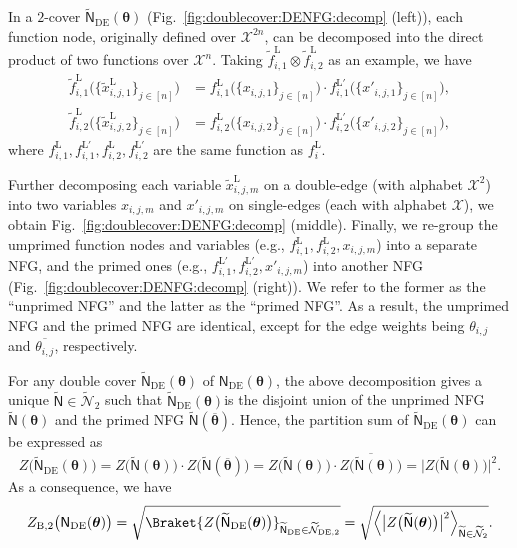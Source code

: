 \documentclass[conference]{IEEEtran}
\theoremstyle{plain}
\theoremstyle{definition}
\newcommand{\B}{\mathrm{B}}
\newcommand{\sfn}{\mathsf{N}}
\newcommand{\fl}[1]{ f^{\mathrm{L}}_{ #1 } }
\newcommand{\tfl}[1]{\widetilde{f}^{\mathrm{L}}_{ #1 }}
\newcommand{\txl}[1]{\widetilde{x}^{\mathrm{L}}_{ #1 }}
\newcommand{\btheta}{\boldsymbol{\theta}}
\newcommand{\sfnDE}{\sfn_{\mathrm{DE}}}
\begin{document}
 In a $2$-cover $\widetilde{\sfn}_\mathrm{DE}(\btheta)$
 (Fig.~\ref{fig:doublecover:DENFG:decomp} (left)), each function node,
 originally defined over $\mathcal X^{2n}$, can be decomposed into the direct
 product of two functions over $\mathcal X^{n}$. Taking $\tfl{i,1}\otimes
 \tfl{i,2}$ as an example, we have
 \begin{align*}
  \tfl{i,1}\bigl( \{\txl{i,j,1}\}_{j\in[n]} \bigr) & =
  \fl{i,1}\bigl( \{x_{i,j,1}\}_{j\in[n]} \bigr) \cdot
  f^{\mathrm{L}'}_{i,1}\bigl( \{x'_{i,j,1}\}_{j\in[n]} \bigr), \\
  \tfl{i,2}\bigl( \{\txl{i,j,2}\}_{j\in[n]} \bigr) & =
  \fl{i,2}\bigl( \{x_{i,j,2}\}_{j\in[n]} \bigr) \cdot
  f^{\mathrm{L}'}_{i,2}\bigl( \{x'_{i,j,2}\}_{j\in[n]} \bigr),
 \end{align*}
 where $\fl{i,1},f^{\mathrm{L}'}_{i,1}, \fl{i,2}, f^{\mathrm{L}'}_{i,2}$ are the same function as $\fl{i}$.

 Further decomposing each variable \(\txl{i,j,m}\) on a double-edge (with
 alphabet $\mathcal X^2$) into two variables \(x_{i,j,m}\) and \(x'_{i,j,m}\)
 on single-edges (each with alphabet $\mathcal X$), we obtain
 Fig.~\ref{fig:doublecover:DENFG:decomp} (middle). Finally, we re-group the
 umprimed function nodes and variables (e.g., \(\fl{i,1}, \fl{i,2},
 x_{i,j,m}\)) into a separate NFG, and the primed ones (e.g.,
 \(f^{\mathrm{L}'}_{i,1}, f^{\mathrm{L}'}_{i,2}, x'_{i,j,m}\)) into another NFG
 (Fig.~\ref{fig:doublecover:DENFG:decomp} (right)). We refer to the former as
 the ``unprimed NFG'' and the latter as the ``primed NFG''. As a result, the
 umprimed NFG and the primed NFG are identical, except for the edge weights
 being $\theta_{i,j}$ and $\overline{\theta_{i,j}}$, respectively.

 For any double cover $\widetilde{\sfn}_{\mathrm{DE}}(\btheta)$ of $\sfnDE(\btheta)$,
 the above decomposition gives a
 unique $\widetilde{\sfn}\in \widetilde {\mathcal N}_2$ such that
 $\widetilde{\sfn}_{\mathrm{DE}}(\btheta)$is the disjoint union of the unprimed NFG
 $\widetilde {\sfn}(\btheta)$ and the primed NFG $\widetilde {\sfn}(\overline
 {\btheta})$. Hence, the partition sum of
 $\widetilde{\sfn}_{\mathrm{DE}}(\btheta)$ can be expressed as
 \[Z\bigl(\widetilde{\sfn}_{\mathrm{DE}}(\btheta)\bigr)=
  Z\bigl(\widetilde{\sfn}(\btheta)\bigr)\cdot Z\bigl(\widetilde{\sfn}(\overline{\btheta})\bigr)=
  Z\bigl(\widetilde{\sfn}(\btheta)\bigr)\cdot \overline{Z\bigl(\widetilde{\sfn}(\btheta)\bigr)}=
  \big|Z\bigl(\widetilde{\sfn}(\btheta)\bigr)\big|^2.\]
 As a consequence, we have
 \[Z_{\B,2}\bigl(\sfnDE(\btheta)\bigr)
  =\sqrt{\Braket{Z\bigl(\widetilde{\sfn}_{\mathrm{DE}}(\btheta)\bigr)}
   _{\widetilde{\sfn}_{\mathrm{DE}}\in\widetilde{\mathcal N}_{\mathrm{DE},2}}}
  =\sqrt{\Big\langle\big| Z \bigl(\widetilde{\sfn}(\btheta)\bigr)\big|^2\Big\rangle
   _{\widetilde{\sfn}\in \widetilde {\mathcal N}_2}}.\]
\end{document}
